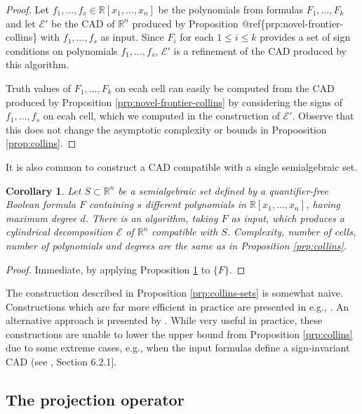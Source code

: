 \documentclass[
]{book}
\newtheorem{corollary}{Corollary}[chapter]
\theoremstyle{definition}
\theoremstyle{definition}
\theoremstyle{definition}
\theoremstyle{definition}
\theoremstyle{remark}
\begin{document}
\begin{proof}
Let \(f_1,\ldots,f_s \in \mathbb{R}[x_1,\ldots,x_n]\) be the polynomials from formulas \(F_1,\ldots,F_k\) and let \(\mathcal{E}'\) be the CAD of \(\mathbb{R}^n\) produced by Proposition @ref\{prp:novel-frontier-collins\} with \(f_1,\ldots,f_s\) as input. Since \(F_i\) for each \(1\le i\le k\) provides a set of sign conditions on polynomials \(f_1,\ldots,f_s\), \(\mathcal{E}'\) is a refinement of the CAD produced by this algorithm.

Truth values of \(F_1,\ldots,F_k\) on ecah cell can easily be computed from the CAD produced by Proposition \ref{prp:novel-frontier-collins} by considering the signs of \(f_1,\ldots,f_s\) on ecah cell, which we computed in the construction of \(\mathcal{E}'\).
Observe that this does not change the asymptotic complexity or bounds in Propoosition \ref{prop:collins}.
\end{proof}

It is also common to construct a CAD compatible with a single semialgebraic set.

\begin{corollary}
\protect\hypertarget{cor:collins-set}{}\label{cor:collins-set}Let \(S\subset \mathbb{R}^n\) be a semialgebraic set defined by a quantifier-free Boolean formula \(F\) containing \(s\) different polynomials in \(\mathbb{R}[x_1,\ldots,x_n]\), having maximum degree \(d\).
There is an algorithm, taking \(F\) as input, which produces a cylindrical decomposition \(\mathcal E\) of \(\mathbb{R}^n\) compatible with \(S\).
Complexity, number of cells, number of polynomials and degrees are the same as in Proposition \ref{prp:collins}.
\end{corollary}

\begin{proof}
Immediate, by applying Proposition \ref{cor:collins-set} to \(\{ F \}\).
\end{proof}

The construction described in Proposition \ref{prp:collins-sets} is somewhat naive.
Constructions which are far more efficient in practice are presented in e.g., \citet{collins1991}. An alternative approach is presented by \citet{bradford2014}.
While very useful in practice, these constructions are unable to lower the upper bound from Proposition \ref{prp:collins} due to some extreme cases, e.g., when the input formulas define a sign-invariant CAD (see \citet{bradford2014}, Section 6.2.1{]}.

\hypertarget{the-projection-operator}{%
\subsection{The projection operator}\label{the-projection-operator}}
\end{document}
